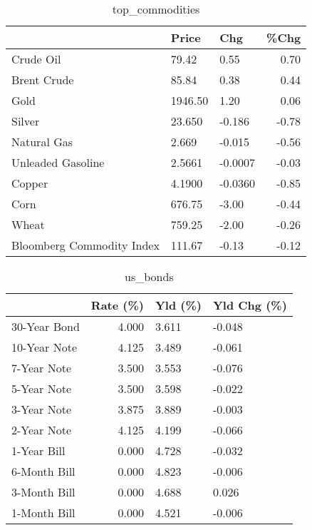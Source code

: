 \documentclass{article}%
\begin{document}
\begin{table}[htbp]%
\caption{top\_commodities}%
\centering%
\begin{adjustbox}{width=1\textwidth}%
\begin{tabular}{lllr}
\toprule
                          &   Price &     Chg &  \%Chg \\
\midrule
               Crude Oil  &   79.42 &    0.55 &  0.70 \\
             Brent Crude  &   85.84 &    0.38 &  0.44 \\
                    Gold  & 1946.50 &    1.20 &  0.06 \\
                  Silver  &  23.650 &  -0.186 & -0.78 \\
             Natural Gas  &   2.669 &  -0.015 & -0.56 \\
       Unleaded Gasoline  &  2.5661 & -0.0007 & -0.03 \\
                  Copper  &  4.1900 & -0.0360 & -0.85 \\
                    Corn  &  676.75 &   -3.00 & -0.44 \\
                   Wheat  &  759.25 &   -2.00 & -0.26 \\
Bloomberg Commodity Index &  111.67 &   -0.13 & -0.12 \\
\bottomrule
\end{tabular}
%
\end{adjustbox}%
\end{table}

%


\begin{table}[htbp]%
\caption{us\_bonds}%
\centering%
\begin{adjustbox}{width=1\textwidth}%
\begin{tabular}{lrll}
\toprule
             &  Rate (\%) & Yld (\%) & Yld Chg (\%) \\
\midrule
30-Year Bond &     4.000 &   3.611 &      -0.048 \\
10-Year Note &     4.125 &   3.489 &      -0.061 \\
 7-Year Note &     3.500 &   3.553 &      -0.076 \\
 5-Year Note &     3.500 &   3.598 &      -0.022 \\
 3-Year Note &     3.875 &   3.889 &      -0.003 \\
 2-Year Note &     4.125 &   4.199 &      -0.066 \\
 1-Year Bill &     0.000 &   4.728 &      -0.032 \\
6-Month Bill &     0.000 &   4.823 &      -0.006 \\
3-Month Bill &     0.000 &   4.688 &       0.026 \\
1-Month Bill &     0.000 &   4.521 &      -0.006 \\
\bottomrule
\end{tabular}
%
\end{adjustbox}%
\end{table}
\end{document}
